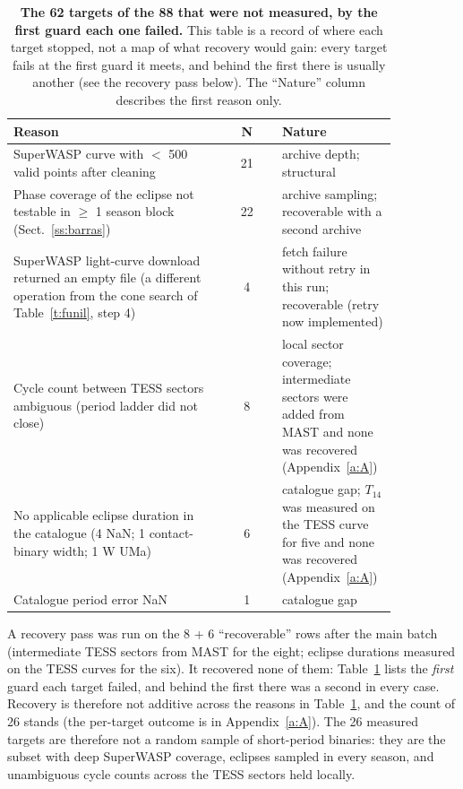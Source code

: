 \documentclass{aa}
\begin{document}
\begin{table}
\caption{\textbf{The 62 targets of the 88 that were not measured, by the first guard each one failed.} This table is a record of where each target stopped, not a map of what recovery would gain: every target fails at the first guard it meets, and behind the first there is usually another (see the recovery pass below). The ``Nature'' column describes the first reason only.}
\label{t:naomedidos}
\centering
\begin{tabular}{p{0.55\linewidth} c p{0.30\linewidth}}
\hline\hline
Reason & N & Nature\\
\hline
SuperWASP curve with $<$ 500 valid points after cleaning & 21 & archive depth; structural\\
Phase coverage of the eclipse not testable in $\ge$ 1 season block (Sect.~\ref{ss:barras}) & 22 & archive sampling; recoverable with a second archive\\
SuperWASP light-curve download returned an empty file (a different operation from the cone search of Table~\ref{t:funil}, step 4) & 4 & fetch failure without retry in this run; recoverable (retry now implemented)\\
Cycle count between TESS sectors ambiguous (period ladder did not close) & 8 & local sector coverage; intermediate sectors were added from MAST and none was recovered (Appendix~\ref{a:A})\\
No applicable eclipse duration in the catalogue (4 NaN; 1 contact-binary width; 1 W UMa) & 6 & catalogue gap; $T_{14}$ was measured on the TESS curve for five and none was recovered (Appendix~\ref{a:A})\\
Catalogue period error NaN & 1 & catalogue gap\\
\hline
\end{tabular}
\end{table}
A recovery pass was run on the 8 + 6 ``recoverable'' rows after the main batch (intermediate TESS sectors from MAST for the eight; eclipse durations measured on the TESS curves for the six). It recovered none of them: Table~\ref{t:naomedidos} lists the \emph{first} guard each target failed, and behind the first there was a second in every case. Recovery is therefore not additive across the reasons in Table~\ref{t:naomedidos}, and the count of 26 stands (the per-target outcome is in Appendix~\ref{a:A}).
The 26 measured targets are therefore not a random sample of short-period binaries: they are the subset with deep SuperWASP coverage, eclipses sampled in every season, and unambiguous cycle counts across the TESS sectors held locally.
\end{document}
